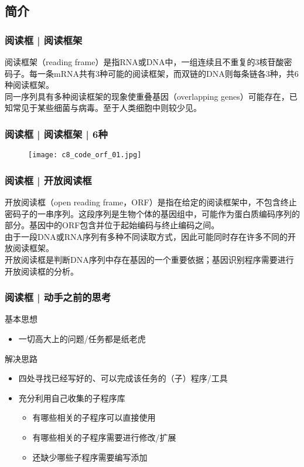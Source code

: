 \subsection{简介}
\begin{frame}
  \frametitle{阅读框 | 阅读框架}
  阅读框架（reading frame）是指RNA或DNA中，一组连续且不重复的3核苷酸密码子。每一条mRNA共有3种可能的阅读框架，而双链的DNA则每条链各3种，共6种阅读框架。\\
  \vspace{1em}
  同一序列具有多种阅读框架的现象使重叠基因（overlapping genes）可能存在，已知常见于某些细菌与病毒。至于人类细胞中则较少见。
\end{frame}

\begin{frame}
  \frametitle{阅读框 | 阅读框架 | \alert{6种}}
  \begin{figure}
    \centering
    \texttt{[image: c8\_code\_orf\_01.jpg]}
  \end{figure}
\end{frame}

\begin{frame}
  \frametitle{阅读框 | \alert{开放阅读框}}
  开放阅读框（open reading frame，ORF）是指在给定的阅读框架中，不包含终止密码子的一串序列。这段序列是生物个体的基因组中，可能作为蛋白质编码序列的部分。基因中的ORF包含并位于起始编码与终止编码之间。\\
  \vspace{1em}
  由于一段DNA或RNA序列有多种不同读取方式，因此可能同时存在许多不同的开放阅读框架。\\
  \vspace{1em}
  开放阅读框是判断DNA序列中存在基因的一个重要依据；基因识别程序需要进行开放阅读框的分析。
\end{frame}

\begin{frame}
  \frametitle{阅读框 | 动手之前的思考}
  \begin{block}{基本思想}
    \begin{itemize}
      \item 一切高大上的问题/任务都是纸老虎
    \end{itemize}
  \end{block}
  \pause
  \begin{block}{解决思路}
    \begin{itemize}
      \item 四处寻找已经写好的、可以完成该任务的（子）程序/工具
      \item 充分利用自己收集的子程序库
	\begin{itemize}
	  \item 有哪些相关的子程序可以直接使用
	  \item 有哪些相关的子程序需要进行修改/扩展
	  \item 还缺少哪些子程序需要编写添加
	\end{itemize}
    \end{itemize}
  \end{block}
\end{frame}

